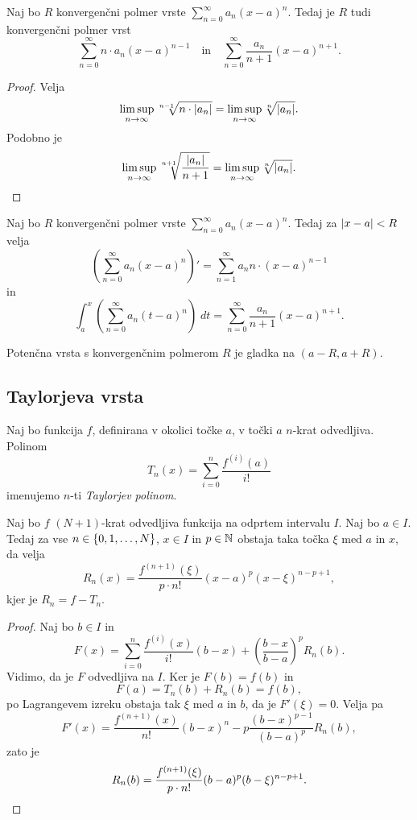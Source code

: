 \documentclass[12pt, a4paper]{article}
\begin{document}
\begin{trditev}
Naj bo $R$ konvergenčni polmer vrste $\displaystyle\sum_{n=0}^\infty a_n(x-a)^n$. Tedaj je $R$ tudi konvergenčni polmer vrst
\[
\sum_{n=0}^\infty n\cdot a_n(x-a)^{n-1}\quad\text{in}\quad \sum_{n=0}^\infty \frac{a_n}{n+1}(x-a)^{n+1}.
\]
\end{trditev}

\begin{proof}
Velja
\[
\limsup_{n\to\infty}\sqrt[n-1]{n\cdot \left\lvert a_n\right\rvert}=\limsup_{n\to\infty}\sqrt[n]{\left\lvert a_n\right\rvert}.
\]
Podobno je
\[
\limsup_{n\to\infty}\sqrt[n+1]{\frac{\left\lvert a_n\right\rvert}{n+1}}=\limsup_{n\to\infty}\sqrt[n]{\left\lvert a_n\right\rvert}.\qedhere
\]
\end{proof}

\begin{posledica}
Naj bo $R$ konvergenčni polmer vrste $\displaystyle\sum_{n=0}^\infty a_n(x-a)^n$. Tedaj za $\left\lvert x-a\right\rvert<R$ velja
\[
\left(\sum_{n=0}^\infty a_n(x-a)^n\right)'=\sum_{n=1}^\infty a_nn\cdot (x-a)^{n-1}
\]
in
\[
\int_a^x\left(\sum_{n=0}^\infty a_n(t-a)^n\right)\;dt=\sum_{n=0}^\infty\frac{a_n}{n+1}(x-a)^{n+1}.
\]
\end{posledica}

\begin{posledica}
Potenčna vrsta s konvergenčnim polmerom $R$ je gladka na $(a-R,a+R)$.
\end{posledica}

\newpage

\subsection{Taylorjeva vrsta}

\begin{definicija}
Naj bo funkcija $f$, definirana v okolici točke $a$, v točki $a$ $n$-krat odvedljiva. Polinom
\[
T_n(x)=\sum_{i=0}^n \frac{f^{(i)}(a)}{i!}
\]
imenujemo $n$-ti \emph{Taylorjev polinom}.
\end{definicija}

\begin{izrek}[Taylor]
Naj bo $f$ $(N+1)$-krat odvedljiva funkcija na odprtem intervalu $I$. Naj bo $a\in I$. Tedaj za vse $n\in\left\{0,1,\dots,N\right\}$, $x\in I$ in $p\in\mathbb{N}$ obstaja taka točka $\xi$ med $a$ in $x$, da velja
\[
R_n(x)=\frac{f^{(n+1)}(\xi)}{p\cdot n!}(x-a)^p(x-\xi)^{n-p+1},
\]
kjer je $R_n=f-T_n$.
\end{izrek}

\begin{proof}
Naj bo $b\in I$ in
\[
F(x)=\sum_{i=0}^n\frac{f^{(i)}(x)}{i!}(b-x)+\left(\frac{b-x}{b-a}\right)^p R_n(b).
\]
Vidimo, da je $F$ odvedljiva na $I$. Ker je $F(b)=f(b)$ in
\[
F(a)=T_n(b)+R_n(b)=f(b),
\]
po Lagrangevem izreku obstaja tak $\xi$ med $a$ in $b$, da je $F'(\xi)=0$. Velja pa
\[
F'(x)=\frac{f^{(n+1)}(x)}{n!}(b-x)^n-p\frac{(b-x)^{p-1}}{(b-a)^p}R_n(b),
\]
zato je
\[
R_n(b)=\frac{f^{(n+1)}(\xi)}{p\cdot n!}(b-a)^p(b-\xi)^{n-p+1}.\qedhere
\]
\end{proof}
\end{document}
